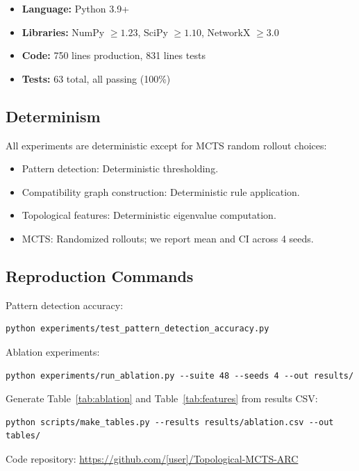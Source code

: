 \documentclass[11pt]{article}
\begin{document}
\begin{itemize}
\item \textbf{Language:} Python 3.9+
\item \textbf{Libraries:} NumPy $\geq 1.23$, SciPy $\geq 1.10$, NetworkX $\geq 3.0$
\item \textbf{Code:} 750 lines production, 831 lines tests
\item \textbf{Tests:} 63 total, all passing (100\%)
\end{itemize}

\subsection{Determinism}

All experiments are deterministic except for MCTS random rollout choices:

\begin{itemize}
\item Pattern detection: Deterministic thresholding.
\item Compatibility graph construction: Deterministic rule application.
\item Topological features: Deterministic eigenvalue computation.
\item MCTS: Randomized rollouts; we report mean and CI across 4 seeds.
\end{itemize}

\subsection{Reproduction Commands}

Pattern detection accuracy:
\begin{lstlisting}
python experiments/test_pattern_detection_accuracy.py
\end{lstlisting}

Ablation experiments:
\begin{lstlisting}
python experiments/run_ablation.py --suite 48 --seeds 4 --out results/
\end{lstlisting}

Generate Table~\ref{tab:ablation} and Table~\ref{tab:features} from results CSV:
\begin{lstlisting}
python scripts/make_tables.py --results results/ablation.csv --out tables/
\end{lstlisting}

Code repository: \url{https://github.com/[user]/Topological-MCTS-ARC}
\end{document}

